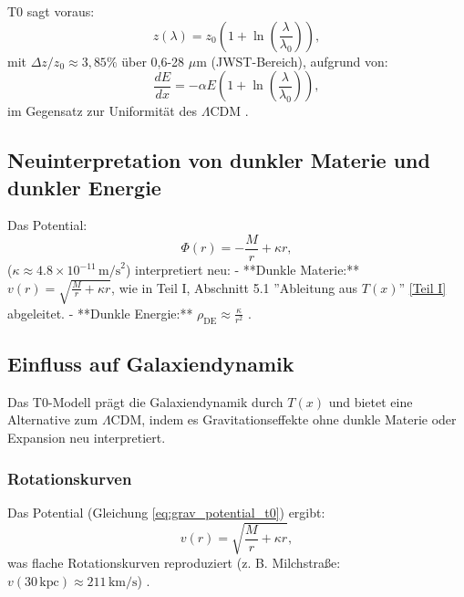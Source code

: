\documentclass[12pt,a4paper]{article}
\newcommand{\Tfield}{T(x)}
\begin{document}
	T0 sagt voraus:
	\begin{equation}
		z(\lambda) = z_0 \left(1 + \ln\left(\frac{\lambda}{\lambda_0}\right)\right),
		\label{eq:wavelength_redshift}
	\end{equation}
	mit \(\Delta z / z_0 \approx 3,85\%\) über 0,6-28 \(\mu\text{m}\) (JWST-Bereich), aufgrund von:
	\begin{equation}
		\frac{dE}{dx} = -\alpha E \left(1 + \ln\left(\frac{\lambda}{\lambda_0}\right)\right),
		\label{eq:wavelength_energy_loss}
	\end{equation}
	im Gegensatz zur Uniformität des \(\Lambda\)CDM \cite{pascher_params_2025}.
	
	\subsection{Neuinterpretation von dunkler Materie und dunkler Energie}
	\label{subsec:dark_reinterpretation}
	
	Das Potential:
	\begin{equation}
		\Phi(r) = -\frac{M}{r} + \kappa r,
		\label{eq:grav_potential_t0}
	\end{equation}
	(\(\kappa \approx 4.8 \times 10^{-11} \, \text{m/s}^2\)) interpretiert neu:
	- **Dunkle Materie:** \(v(r) = \sqrt{\frac{M}{r} + \kappa r}\), wie in Teil I, Abschnitt 5.1 ''Ableitung aus \(\Tfield\)'' \href{https://github.com/jpascher/T0-Time-Mass-Duality/tree/main/2/pdf/Deutsch/QMRelTimeMassPart1.pdf}{[Teil I]} abgeleitet.
	- **Dunkle Energie:** \(\rho_{\text{DE}} \approx \frac{\kappa}{r^2}\) \cite{pascher_galaxies_2025}.
	
	\subsection{Einfluss auf Galaxiendynamik}
	\label{subsec:galaxy_dynamics}
	
	Das T0-Modell prägt die Galaxiendynamik durch \(\Tfield\) und bietet eine Alternative zum \(\Lambda\)CDM, indem es Gravitationseffekte ohne dunkle Materie oder Expansion neu interpretiert.
	
	\subsubsection{Rotationskurven}
	Das Potential (Gleichung \ref{eq:grav_potential_t0}) ergibt:
	\begin{equation}
		v(r) = \sqrt{\frac{M}{r} + \kappa r},
		\label{eq:rotation_velocity}
	\end{equation}
	was flache Rotationskurven reproduziert (z. B. Milchstraße: \(v(30 \, \text{kpc}) \approx 211 \, \text{km/s}\)) \cite{pascher_galaxies_2025}.
	
\end{document}
